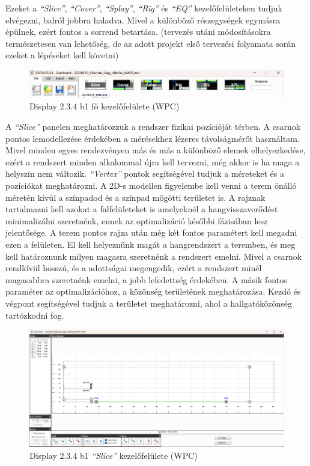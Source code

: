 Ezeket a \textit{``Slice''}, \textit{``Cover''}, \textit{``Splay''}, \textit{``Rig''} és \textit{``EQ''} kezelőfelületeken tudjuk elvégezni,
balról jobbra haladva. Mivel a különböző részegységek egymásra épülnek, ezért fontos a sorrend betartása.
(tervezés utáni módosításokra természetesen van lehetőség, de az adott projekt első tervezési folyamata során ezeket a lépéseket kell követni)
\begin{figure}[H]
	\centering
	\includegraphics[width=\textwidth, keepaspectratio]{figures/display_wpc_0_1.png}
	\caption{Display 2.3.4 b1 fő kezelőfelülete (WPC)}\label{fig:display_wpc_0_1}
\end{figure}
A \textit{``Slice''} panelen meghatározzuk a rendszer fizikai pozícióját térben. A csarnok
pontos lemodellezése érdekében a mérésekhez lézeres távolságmérőt használtam.
Mivel minden egyes rendezvényen más és más a különböző elemek elhelyezkedése, ezért a
rendszert minden alkalommal újra kell tervezni, még akkor is ha maga a helyszín nem változik.
\textit{``Vertex''} pontok segítségével tudjuk a méreteket és a pozíciókat meghatározni.
A 2D-s modellen figyelembe kell venni a terem önálló méretén kívül a színpadod és a színpad mögötti területet is.
A rajznak tartalmazni kell azokat a falfelületeket is amelyeknél a hangvisszaverődést minimalizálni szeretnénk,
ennek az optimalizáció későbbi fázisában lesz jelentősége.
A terem pontos rajza után még két fontos paramétert kell megadni ezen a felületen.
El kell helyeznünk magát a hangrendszert a teremben, és meg kell határoznunk milyen magasra szeretnénk a rendszert emelni.
Mivel a csarnok rendkívül hosszú, és a adottságai megengedik, ezért a rendszert minél magasabbra szeretnénk emelni,
a jobb lefedettség érdekében.
A másik fontos paraméter az optimalizációhoz, a közönség területének meghatározása. Kezdő és végpont segítségével
tudjuk a területet meghatározni, ahol a hallgatóközönség tartózkodni fog.
\begin{figure}[H]
	\centering
	\includegraphics[width=\textwidth, keepaspectratio]{figures/display_wpc_1.png}
	\caption{Display 2.3.4 b1 \textit{``Slice''} kezelőfelülete (WPC)}\label{fig:display_wpc_1}
\end{figure}
